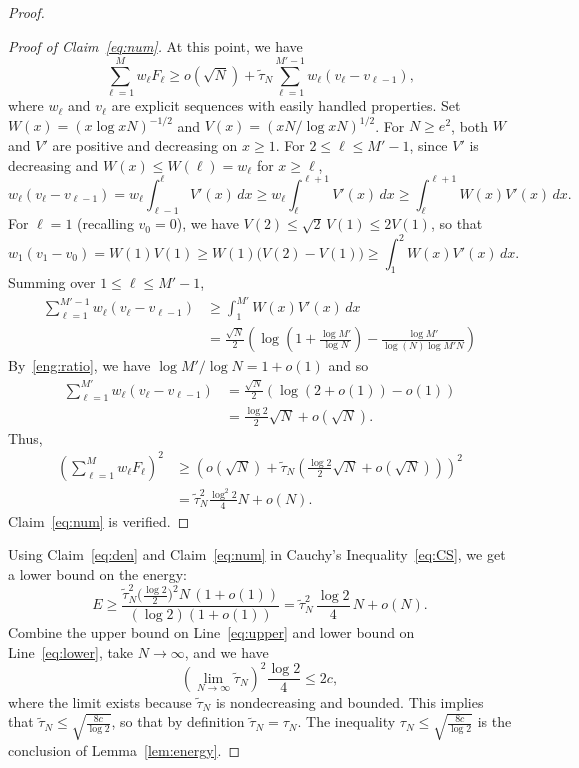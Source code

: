 \documentclass[10pt]{article}
\begin{document}
\begin{proof}
\begin{proof}[Proof of Claim~\ref{eq:num}]
At this point, we have
    \[\sum_{\ell=1}^{M} w_\ell F_\ell \ge o(\sqrt N)+ \widetilde{\tau}_N \sum_{\ell=1}^{M'-1} w_\ell(v_\ell-v_{\ell-1}),\]
where $w_\ell$ and $v_\ell$ are explicit sequences with easily handled properties. Set $W(x)=(x \log xN)^{-1/2}$ and $V(x)=(xN/\log xN)^{1/2}$. For $N\ge e^2$, both $W$ and $V'$ are positive and decreasing on $x\ge 1$. 
For $2\le \ell\le M'-1$, since $V'$ is decreasing and $W(x)\le W(\ell)=w_\ell$ for $x\ge\ell$,
  \[w_\ell(v_\ell - v_{\ell-1}) = w_\ell\int_{\ell-1}^{\ell} V'(x)\,dx
    \ge w_\ell\int_{\ell}^{\ell+1} V'(x)\,dx
    \ge \int_{\ell}^{\ell+1} W(x)V'(x)\,dx.\]
For $\ell=1$ (recalling $v_0=0$), we have $V(2)\le\sqrt2\,V(1)\le 2V(1)$, so that
  \[w_1(v_1-v_0) = W(1)V(1) \ge W(1)\bigl(V(2)-V(1)\bigr) \ge \int_1^2 W(x)V'(x)\,dx.\]
Summing over $1\le\ell\le M'-1$,
\begin{align*}
    \sum_{\ell=1}^{M'-1} w_\ell(v_\ell-v_{\ell-1})
    &\ge \int_1^{M'} W(x) V'(x)\,dx \\
    &=\frac{\sqrt{N}}{2} \left(\log\left(1+\frac{\log M'}{\log N}\right)- \frac{\log M'}{\log(N) \log M'N}\right)
\end{align*}
By~\ref{eng:ratio}, we have $\log M' /\log N = 1+o(1)$ and so
\begin{align*}
  \sum_{\ell=1}^{M'} w_\ell(v_\ell-v_{\ell-1})
    &=\frac{\sqrt{N}}{2} \left(\log(2+o(1))-o(1)\right) \\
    &=\frac{\log 2}{2}\sqrt{N} + o(\sqrt N).
\end{align*}
Thus,
    \begin{align*}
    \left(\sum_{\ell=1}^{M} w_\ell F_\ell\right)^2
    &\ge \left( o(\sqrt{N})+ \widetilde{\tau}_N \left(\frac{\log 2}{2}\sqrt{N} + o(\sqrt N)\right)\right)^2 \\
    &= \widetilde{\tau}_N^2\frac{\log^2 2}{4} N + o(N).
    \end{align*}
Claim~\ref{eq:num} is verified.
\end{proof}

Using Claim~\ref{eq:den} and Claim~\ref{eq:num} in Cauchy's Inequality~\eqref{eq:CS}, we get a lower bound on the energy:
\begin{equation}\label{eq:lower}
   E\ge\frac{\widetilde{\tau}_N^{2}\bigl(\tfrac{\log2}{2}\bigr)^{2}N\,(1+o(1))}
            {(\log2)(1+o(1))}
   =\widetilde{\tau}_N^{2}\,\frac{\log2}{4}\,N+o(N).
\end{equation}
Combine the upper bound on Line~\eqref{eq:upper} and lower bound on Line~\eqref{eq:lower}, take $N\to\infty$, and we have
    \[ \left(\lim_{N\to\infty} \widetilde{\tau}_N\right)^2\frac{\log 2}{4} \le 2c,\]
where the limit exists because $\widetilde{\tau}_N$ is nondecreasing and bounded.
This implies that $\widetilde{\tau}_N\le \sqrt{\frac{8c}{\log 2}}$, so that by definition $\widetilde{\tau}_N=\tau_N$.
The inequality $\tau_N \le \sqrt{\frac{8c}{\log 2}}$ is the conclusion of Lemma~\ref{lem:energy}.
\end{proof}
\end{document}
